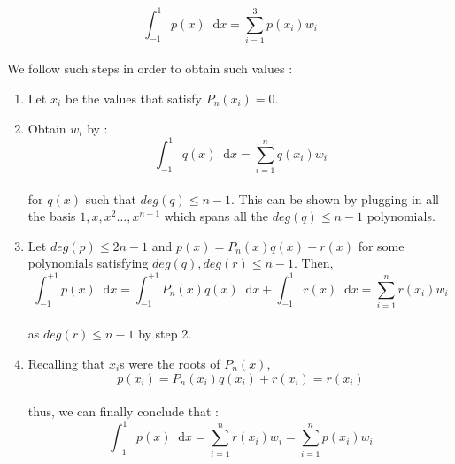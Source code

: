 \documentclass[paper=a4, fontsize=11pt]{scrartcl}
\newcommand*\dif{\mathop{}\!\mathrm{d}}
\begin{document}
\begin{equation}\nonumber
	\int_{-1}^{1} p(x) \dif x = \sum_{i=1}^{3} p(x_i) w_i
\end{equation}\\

We follow such steps in order to obtain such values : \\

\begin{enumerate}
	\item Let $x_i$ be the values that satisfy $P_n(x_i)=0$. 
	\item Obtain $w_i$ by : \\
	
	\begin{equation}\nonumber
		\int_{-1}^{1} q(x) \dif x =  \sum_{i=1}^{n} q(x_i) w_i
	\end{equation}\\
	
	for $q(x)$ such that $deg(q)\leq n-1$. This can be shown by plugging in all the basis $1,x, x^2 \dots , x^{n-1}$ which spans all the $deg(q) \leq n-1$ polynomials. 
	
	\item Let $deg(p) \leq 2n-1$ and $p(x)=P_n(x)q(x) + r(x)$ for some polynomials satisfying $deg(q),deg(r)\leq n-1$. Then, \\
	
	\begin{equation}\nonumber
		\int_{-1}^{+1} p(x) \dif x = \int_{-1}^{+1} P_n(x) q(x) \dif x + \int_{-1}^{1} r(x) \dif x=  \sum_{i=1}^{n} r(x_i) w_i
	\end{equation}\\
	
	as $deg(r)\leq n-1$ by step 2.
	
	\item Recalling that $x_i$s were the roots of $P_n(x)$, \\
	
	\begin{equation}\nonumber
		p(x_i) = P_n(x_i)q(x_i) + r(x_i) = r(x_i)
	\end{equation}\\
	
	thus, we can finally conclude that : \\
	
	\begin{equation}\nonumber
		\int_{-1}^1 p(x) \dif x =  \sum_{i=1}^{n} r(x_i) w_i =  \sum_{i=1}^{n} p(x_i) w_i
	\end{equation}\\
\end{enumerate}
\end{document}
